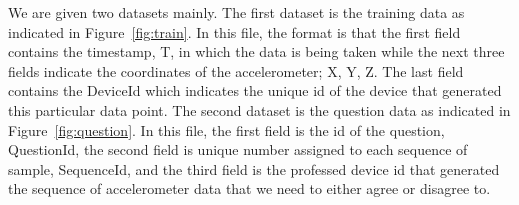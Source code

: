 We are given two datasets mainly. The first dataset is the training data as
indicated in Figure~\ref{fig:train}. In this file, the format is that the first
field contains the timestamp, T, in which the data is being taken while the
next three fields indicate the coordinates of the accelerometer; X, Y, Z. The
last field contains the DeviceId which indicates the unique id of the device
that generated this particular data point. The second dataset is the question
data as indicated in Figure~\ref{fig:question}. In this file, the first field
is the id of the question, QuestionId, the second field is unique number
assigned to each sequence of sample, SequenceId, and the third field is the
professed device id that generated the sequence of accelerometer data that we
need to either agree or disagree to.
